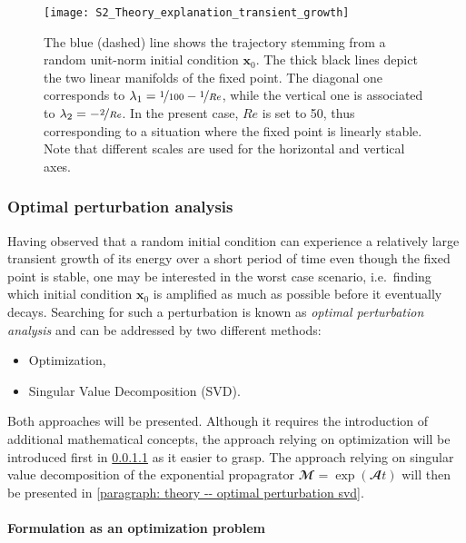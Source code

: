   \begin{figure}[b]
    \centering
    \texttt{[image: S2\_Theory\_explanation\_transient\_growth]}
    \caption{The blue (dashed) line shows the trajectory stemming from a random unit-norm initial condition $\mathbf{x}_0$. The thick black lines depict the two linear manifolds of the fixed point. The diagonal one corresponds to $\lambda_1 = \nicefrac{1}{100} - \nicefrac{1}{Re}$, while the vertical one is associated to $\lambda_2 = -\nicefrac{2}{Re}$. In the present case, $Re$ is set to 50, thus corresponding to a situation where the fixed point is linearly stable. Note that different scales are used for the horizontal and vertical axes.}
    \label{fig: theory -- illustration transient growth}
  \end{figure}

    \subsubsection{Optimal perturbation analysis}
    \label{subsubsec: theory -- optimal perturbation}

    Having observed that a random initial condition can experience a relatively large transient growth of its energy over a short period of time even though the fixed point is stable, one may be interested in the worst case scenario, i.e.\ finding which initial condition $\mathbf{x}_0$ is amplified as much as possible before it eventually decays. Searching for such a perturbation is known as \emph{optimal perturbation analysis} and can be addressed by two different methods:
    \begin{itemize}
      \item Optimization,
      \item Singular Value Decomposition (SVD).
    \end{itemize}
    Both approaches will be presented. Although it requires the introduction of additional mathematical concepts, the approach relying on optimization will be introduced first in \textsection \ref{paragraph: theory -- optimal perturbation optimization} as it easier to grasp. The approach relying on singular value decomposition of the exponential propagrator $\mathbfcal{M} = \exp \left( \mathbfcal{A} t \right)$ will then be presented in \textsection \ref{paragraph: theory -- optimal perturbation svd}.

      \paragraph{Formulation as an optimization problem}
      \label{paragraph: theory -- optimal perturbation optimization}

